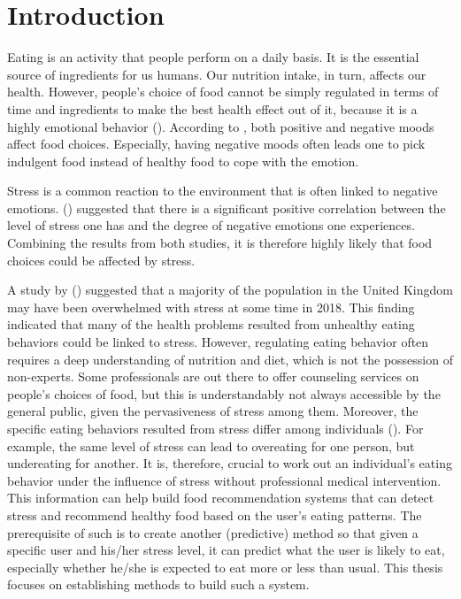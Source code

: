 
\chapter{Introduction}\label{chapter:introduction}
Eating is an activity that people perform on a daily basis. It is the essential source of ingredients for us humans. Our nutrition intake, in turn, affects our health. However, people’s choice of food cannot be simply regulated in terms of time and ingredients to make the best health effect out of it, because it is a highly emotional behavior (\cite{4_mood_eat, 14_comfort_food}). According to \citeauthor{4_mood_eat}, both positive and negative moods affect food choices. Especially, having negative moods often leads one to pick indulgent food instead of healthy food to cope with the emotion.

Stress is a common reaction to the environment that is often linked to negative emotions. \citeauthor{1_stress_emotion} (\citeyear{1_stress_emotion}) suggested that there is a significant positive correlation between the level of stress one has and the degree of negative emotions one experiences. Combining the results from both studies, it is therefore highly likely that food choices could be affected by stress.

A study by \citeauthor{2_many_stress} (\citeyear{2_many_stress}) suggested that a majority of the population in the United Kingdom may have been overwhelmed with stress at some time in 2018. This finding indicated that many of the health problems resulted from unhealthy eating behaviors could be linked to stress. However, regulating eating behavior often requires a deep understanding of nutrition and diet, which is not the possession of non-experts. Some professionals are out there to offer counseling services on people’s choices of food, but this is understandably not always accessible by the general public, given the pervasiveness of stress among them. Moreover, the specific eating behaviors resulted from stress differ among individuals (\cite{5_stress_eating}). For example, the same level of stress can lead to overeating for one person, but undereating for another. It is, therefore, crucial to work out an individual’s eating behavior under the influence of stress without professional medical intervention. This information can help build food recommendation systems that can detect stress and recommend healthy food based on the user’s eating patterns. The prerequisite of such is to create another (predictive) method so that given a specific user and his/her stress level, it can predict what the user is likely to eat, especially whether he/she is expected to eat more or less than usual. This thesis focuses on establishing methods to build such a system. \bigskip

